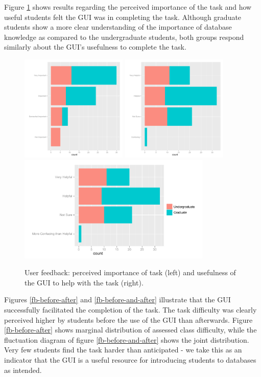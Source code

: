\documentclass[11pt]{tise_style}
\begin{document}
Figure \ref{fb-use-importance} shows results regarding the perceived importance of the task and how useful students felt the GUI was in completing the task. Although graduate students show a more clear understanding of the importance of database knowledge as compared to the undergraduate students, both groups 
respond similarly about the GUI's usefulness to complete the task.

\begin{figure}[htbp] %
   \centering
   \includegraphics[height=2in, keepaspectratio=true]{fb-importance.pdf} 
   \includegraphics[height=2in, keepaspectratio=true]{fb-useful.pdf} 
   \includegraphics[height=2in, keepaspectratio=true]{fb-legend.pdf} 
   \caption{User feedback: perceived importance of task (left) and usefulness of the GUI to help with the task (right).}
   \label{fb-use-importance}
\end{figure}

Figures \ref{fb-before-after} and \ref{fb-before-and-after} illustrate that the GUI successfully facilitated the completion of the task. The task difficulty was clearly perceived higher by students before the use of the GUI than afterwards. Figure \ref{fb-before-after} shows marginal distribution of assessed class difficulty, while the fluctuation diagram of figure \ref{fb-before-and-after} shows the joint distribution. Very few students  find the task harder than anticipated - we take this as an indicator that the GUI is a useful resource for introducing students to databases as intended.  
\end{document}
